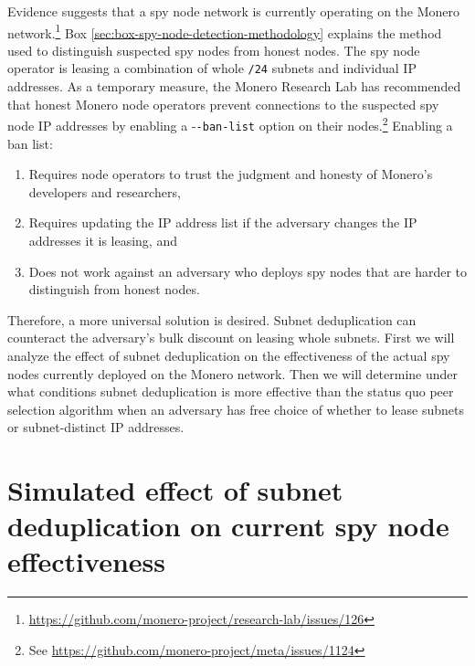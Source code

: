 \documentclass[english]{mrl}
\theoremstyle{plain}
\begin{document}
Evidence suggests that a spy node network is currently operating on
the Monero network.\footnote{\href{https://github.com/monero-project/research-lab/issues/126}{https://github.com/monero-project/research-lab/issues/126}}
Box \ref{sec:box-spy-node-detection-methodology} explains the method
used to distinguish suspected spy nodes from honest nodes. The spy
node operator is leasing a combination of whole \texttt{/24} subnets
and individual IP addresses. As a temporary measure, the Monero Research
Lab has recommended that honest Monero node operators prevent connections
to the suspected spy node IP addresses by enabling a -{}\texttt{-ban-list}
option on their nodes.\footnote{See \href{https://github.com/monero-project/meta/issues/1124}{https://github.com/monero-project/meta/issues/1124}}
Enabling a ban list:
\begin{enumerate}
\item Requires node operators to trust the judgment and honesty of Monero's
developers and researchers,
\item Requires updating the IP address list if the adversary changes the
IP addresses it is leasing, and
\item Does not work against an adversary who deploys spy nodes that are
harder to distinguish from honest nodes.
\end{enumerate}
Therefore, a more universal solution is desired. Subnet deduplication
can counteract the adversary's bulk discount on leasing whole subnets.
First we will analyze the effect of subnet deduplication on the effectiveness
of the actual spy nodes currently deployed on the Monero network.
Then we will determine under what conditions subnet deduplication
is more effective than the status quo peer selection algorithm when
an adversary has free choice of whether to lease subnets or subnet-distinct
IP addresses.


\section{Simulated effect of subnet deduplication on current spy node effectiveness}
\end{document}
